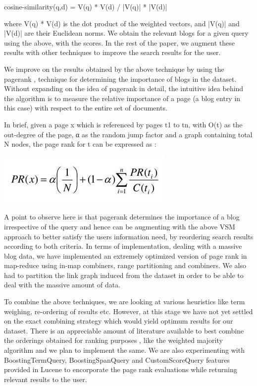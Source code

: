 \documentclass{acm_proc_article-sp}
\begin{document}
cosine-similarity(q,d) = V(q) * V(d) / |V(q)| * |V(d)| 

where V(q) * V(d) is the dot product of the weighted vectors, and |V(q)| and |V(d)| are their Euclidean norms. We obtain the relevant blogs for a given query using the above, with the scores. In the rest of the paper, we augment these results with other techniques to improve the search results for the user.

We improve on the results obtained by the above technique by using the pagerank \cite{page1999pagerank}\cite{brin1998anatomy}, technique for determining the importance of blogs in the dataset. Without expanding on the idea of pagerank in detail, the intuitive idea behind the algorithm is to measure the relative importance of a page (a blog entry in this case) with respect to the entire set of documents.

In brief, given a page x which is referenced by pages t1 to tn, with O(t) as the out-degree of the page, α as the random jump factor and a graph containing total N nodes, the page rank for t can be expressed as : 

\includegraphics{eqn.png}

A point to observe here is that pagerank determines the importance of a blog irrespective of the query and hence can be augmenting with the above VSM approach to better satisfy the users information need, by reordering search results according to both criteria. In terms of implementation, dealing with a massive blog data, we have implemented an extremely optimized version of page rank in map-reduce using in-map combiners, range partitioning and combiners. We also had to partition the link graph induced from the dataset in order to be able to deal with the massive amount of data.

To combine the above techniques, we are looking at various heuristics like term weighing, re-ordering of results etc. However, at this stage we have not yet settled on the exact combining strategy which would yield optimum results for our dataset. There is an appreciable amount of literature available to best combine the orderings obtained for ranking purposes \cite{littlestone1989weighted}, like the weighted majority algorithm and we plan to implement the same. We are also experimenting with BoostingTermQuery, BoostingSpanQuery and CustomScoreQuery features provided in Lucene to encorporate the page rank evaluations while returning relevant results to the user.
\end{document}
